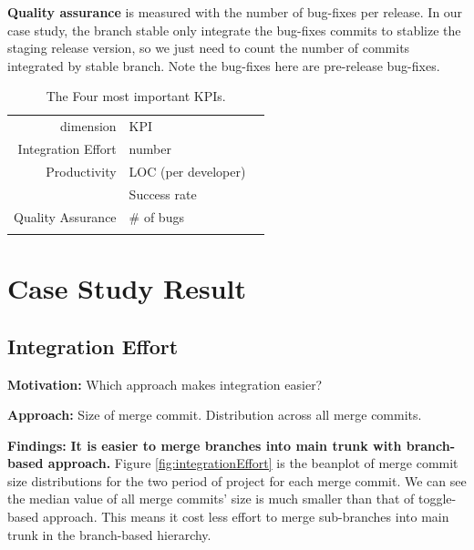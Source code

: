 \textbf{Quality assurance} is measured with the number of bug-fixes per release. In our case study, the branch stable only integrate the bug-fixes commits to stablize the staging release version, so we just need to count the number of commits integrated by stable branch. Note the bug-fixes here are pre-release bug-fixes.



\begin{table}
\caption{The Four most important KPIs.}
\label{tab:KPI}       %
\begin{tabular}{rll}
\hline\noalign{\smallskip}
dimension & KPI   \\
\noalign{\smallskip}\hline\noalign{\smallskip}
Integration Effort & number \\
Productivity & LOC (per developer) \\
 & Success rate \\
Quality Assurance & \# of bugs \\
\noalign{\smallskip}\hline
\end{tabular}
\end{table}


\section{Case Study Result}
\label{sec:result}

\subsection{Integration Effort}

\textbf{Motivation:} 
Which approach makes integration easier?

\textbf{Approach:}
Size of merge commit. Distribution across all merge commits.

\textbf{Findings:} 
\textbf{It is easier to merge branches into main trunk with branch-based approach.} Figure \ref{fig:integrationEffort} is the beanplot of merge commit size distributions for the two period of project for each merge commit. We can see the median value of all merge commits' size is much smaller than that of toggle-based approach. This means it cost less effort to merge sub-branches into main trunk in the branch-based hierarchy. 

